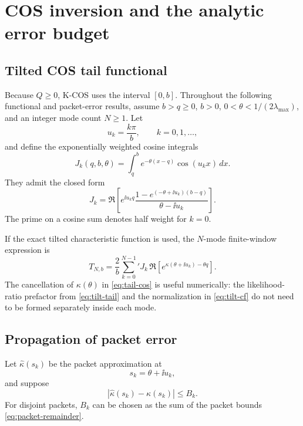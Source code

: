 \chapter{COS inversion and the analytic error budget}\label{ch:inversion}
\section{Tilted COS tail functional}

Because $Q\ge0$, K-COS uses the interval $[0,b]$.  Throughout the
following functional and packet-error results, assume $b>q\ge0$, $b>0$,
$0<\theta<1/(2\lambda_{\max})$, and an integer mode count $N\ge1$.  Let
\[
u_k=\frac{k\pi}{b},
\qquad k=0,1,\ldots,
\]
and define the exponentially weighted cosine integrals
\begin{equation}
J_k(q,b,\theta)
=\int_q^b e^{-\theta(x-q)}\cos(u_kx)\,dx.
\label{eq:J-def}
\end{equation}
They admit the closed form
\begin{equation}
J_k
=\Re\left[
 e^{\ii u_k q}
 \frac{1-e^{(-\theta+\ii u_k)(b-q)}}{\theta-\ii u_k}
\right].
\label{eq:J-formula}
\end{equation}
The prime on a cosine sum denotes half weight for $k=0$.

If the exact tilted characteristic function is used, the $N$-mode finite-window expression is
\begin{equation}
T_{N,b}
=\frac{2}{b}\sum_{k=0}^{N-1}{}'
J_k\,
\Re\left[e^{\kappa(\theta+\ii u_k)-\theta q}\right].
\label{eq:tail-cos}
\end{equation}
The cancellation of $\kappa(\theta)$ in \eqref{eq:tail-cos} is useful numerically: the likelihood-ratio prefactor from \eqref{eq:tilt-tail} and the normalization in \eqref{eq:tilt-cf} do not need to be formed separately inside each mode.

\section{Propagation of packet error}

Let $\widehat\kappa(s_k)$ be the packet approximation at
\[
s_k=\theta+\ii u_k,
\]
and suppose
\begin{equation}
|\widehat\kappa(s_k)-\kappa(s_k)|\le B_k.
\label{eq:Bk}
\end{equation}
For disjoint packets, $B_k$ can be chosen as the sum of the packet bounds \eqref{eq:packet-remainder}.

